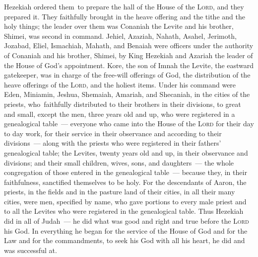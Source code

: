 \begin{inparaenum}
     Hezekiah ordered them\understood\ to prepare the hall of the House of the \textsc{Lord}, and they prepared it.\understood%
     They faithfully brought in the heave offering and the tithe and the holy things; the leader over them was Conaniah the Levite and his brother, Shimei, was second in command.\understood%
     Jehiel, Azaziah, Nahath, Asahel, Jerimoth, Jozabad, Eliel, Ismachiah, Mahath, and Benaiah were officers under the authority of Conaniah and his brother, Shimei, by King Hezekiah and Azariah the leader of the House of God's appointment.%
     Kore, the son of Imnah the Levite, the eastward gatekeeper, was in charge of the free-will offerings of God, the distribution of the heave offerings of the \textsc{Lord}, and the holiest items.%
     Under his command were Eden, Miniamin, Jeshua, Shemaiah, Amariah, and Shecaniah, in the cities of the priests, who\understood\ faithfully distributed to their brothers in their divisions, to great and small,%
     except the men, three years old and up, who were registered in a genealogical table~--- everyone who came into the House of the \textsc{Lord} for their day to day work, for their service in their observance and according to their divisions~---%
     along with the priests who were registered in their fathers' genealogical table; the Levites, twenty years old and up, in their observance and divisions;%
     and their small children, wives, sons, and daughters~--- the whole congregation of those entered in the genealogical table~--- because they, in their faithfulness, sanctified themselves to be holy.%
     For the descendants of Aaron, the priests, in the fields and in the pasture land of their cities, in all their many cities, were men, specified by name, who gave portions to every male priest and to all the Levites who were registered in the genealogical table.%
     Thus Hezekiah did in all of Judah~--- he did what was good and right and true before the \textsc{Lord} his God.%
     In everything he began for the service of the House of God and for the Law and for the commandments, to seek his God with all his heart, he did and was successful at.\understood%
\end{inparaenum}
